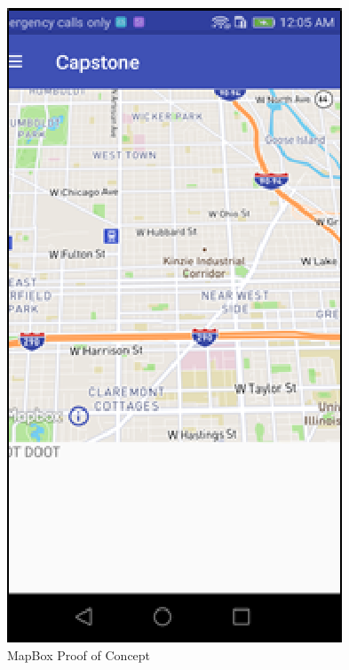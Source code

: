 \documentclass[letterpaper, 10pt,titlepage]{article}
\begin{document}
\begin{figure}[ht]
    \centering
    \includegraphics[scale=1.2]{android2}
    \caption{MapBox Proof of Concept}
    \label{charles2}
\end{figure}
\end{document}
